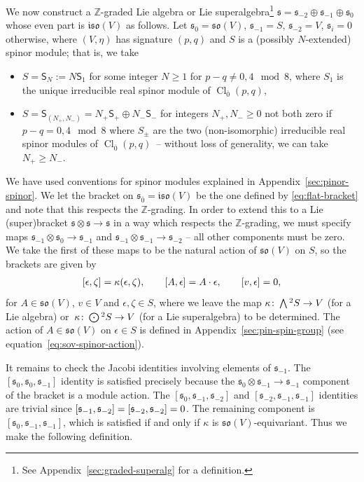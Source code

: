 \documentclass[11pt]{article}
\numberwithin{equation}{section}
\numberwithin{equation}{section}
\newcommand{\fs}{\mathfrak{s}}
\newcommand{\fso}{\mathfrak{so}}
\newcommand{\fiso}{\mathfrak{iso}}
\newcommand{\ZZ}{\mathbb{Z}}
\newcommand{\ssS}{\mathsf{S}}
\newcommand{\Wedge}{\mathchoice{{\textstyle\bigwedge}}{\bigwedge}{\bigwedge}{\bigwedge}}	%
\newcommand{\Odot}{\mathchoice{{\textstyle\bigodot}}{\bigodot}{\bigodot}{\bigodot}}
\newcommand{\1}{\mathbbm{1}}
\DeclareMathOperator{\Cl}{Cl}
\begin{document}
We now construct a $\ZZ$-graded Lie algebra or Lie superalgebra\footnote{See Appendix~\ref{sec:graded-superalg} for a definition.} $\fs=\fs_{-2}\oplus\fs_{-1}\oplus\fs_{0}$ whose even part is $\fiso(V)$ as follows. Let
$\fs_0 = \fso(V)$, $
 \fs_{-1} = S$, $
 \fs_{-2} = V$, $
 \fs_i = 0$ otherwise,
where $(V,\eta)$ has signature $(p,q)$ and $S$ is a (possibly $N$-extended) spinor module; that is, we take
\begin{itemize}\itemsep=0pt
	\item $S = \ssS_N := N\ssS_1$ for some integer $N\geq 1$ for $p-q\neq 0,4\mod 8$, where $S_1$ is the unique irreducible real spinor module of $\Cl_{\overline 0}(p,q)$,
	\item $S = \ssS_{(N_+,N_-)} = N_+\ssS_+\oplus N_-\ssS_-$ for integers $N_+, N_-\geq 0$ not both zero if $p-q= 0,4\mod 8$ where $S_\pm$ are the two (non-isomorphic) irreducible real spinor modules of $\Cl_{\overline 0}(p,q)$~-- without loss of generality, we can take $N_+\geq N_-$.
\end{itemize}
We have used conventions for spinor modules explained in Appendix~\ref{sec:pinor-spinor}. We let the bracket on $\fs_{\overline 0}=\fiso(V)$ be the one defined by \eqref{eq:flat-bracket} and note that this respects the $\ZZ$-grading. In order to extend this to a Lie (super)bracket $\fs\otimes\fs\to\fs$ in a way which respects the $\ZZ$-grading, we must specify maps $\fs_{-1}\otimes\fs_0\to\fs_{-1}$ and $\fs_{-1}\otimes\fs_{-1}\to\fs_{-2}$ -- all other components must be zero. We take the first of these maps to be the natural action of $\fso(V)$ on $S$, so the brackets are given by
\begin{align}\label{eq:flat-spinor-bracket}
 \comm{\epsilon}{\zeta} = \kappa(\epsilon,\zeta),\qquad
 \comm{A}{\epsilon} = A\cdot\epsilon,\qquad
 \comm{v}{\epsilon} = 0,
\end{align}
for $A\in\fso(V)$, $v\in V$ and $\epsilon,\zeta\in S$, where we leave the map $\kappa\colon \Wedge^2 S\to V$ (for a Lie algebra) or~${\kappa\colon \Odot^2 S\to V}$ (for a Lie superalgebra) to be determined. The action of $A\in\fso(V)$ on $\epsilon\in S$ is defined in Appendix~\ref{sec:pin-spin-group} (see equation~\eqref{eq:sov-spinor-action}).

It remains to check the Jacobi identities involving elements of $\fs_{-1}$. The $[\fs_0,\fs_0,\fs_{-1}]$ identity is satisfied precisely because the $\fs_0\otimes\fs_{-1}\to\fs_{-1}$ component of the bracket is a module action. The $[\fs_0,\fs_{-1},\fs_{-2}]$ and $[\fs_{-2},\fs_{-1},\fs_{-1}]$ identities are trivial since $\comm{\fs_{-1}}{\fs_{-2}}=\comm{\fs_{-2}}{\fs_{-2}}=0$. The remaining component is $[\fs_0,\fs_{-1},\fs_{-1}]$, which is satisfied if and only if $\kappa$ is $\fso(V)$-equivariant. Thus we make the following definition.
\end{document}

